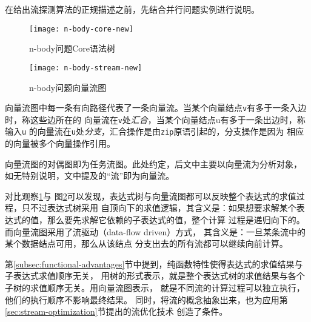 在给出流探测算法的正规描述之前，先结合并行问题实例进行说明。
\begin{quotation}
\end{quotation}
\begin{figure}
  \centering
  \texttt{[image: n-body-core-new]}
  \caption{n-body问题Core语法树}
  \label{fig:n-body-core}
\end{figure}
\begin{figure}
  \centering
  \texttt{[image: n-body-stream-new]}
  \caption{n-body问题向量流图}
  \label{fig:n-body-stream}
\end{figure}

向量流图中每一条有向路径代表了一条向量流。当某个向量结点\texttt{v}有多于一条入边时，称这些边所在的
向量流在\texttt{v}处\emph{汇合}，当某个向量结点u有多于一条出边时，称输入\texttt{u}
的向量流在\texttt{u}处\emph{分支}，汇合操作是由\texttt{zip}原语引起的，分支操作是因为
相应的向量被多个向量操作引用。

向量流图的对偶图即为任务流图。此处约定，后文中主要以向量流为分析对象，
如无特别说明，文中提及的“流”即为向量流。

对比观察\ref{fig:n-body-core}与
图\ref{fig:n-body-stream}可以发现，表达式树与向量流图都可以反映整个表达式的求值过程，只不过表达式树采用
自顶向下的求值逻辑，其含义是：如果想要求解某个表达式的值，那么要先求解它依赖的子表达式的值，整个计算
过程是递归向下的。
而向量流图采用了流驱动（data-flow driven）方式，
其含义是：一旦某条流中的某个数据结点可用，那么从该结点
分支出去的所有流都可以继续向前计算。

第\ref{subsec:functional-advantages}节中提到，纯函数特性使得表达式的求值结果与子表达式求值顺序无关，
用树的形式表示，就是整个表达式树的求值结果与各个子树的求值顺序无关。用向量流图表示，
就是不同流的计算过程可以独立执行，他们的执行顺序不影响最终结果。
同时，将流的概念抽象出来，也为应用第\ref{sec:stream-optimization}节提出的流优化技术
创造了条件。

